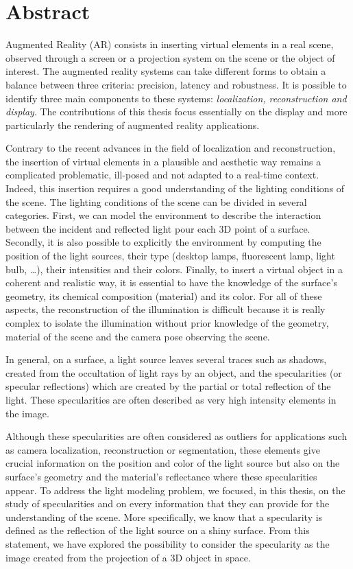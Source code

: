 \chapter*{Abstract}

\vspace{-1.3cm}

Augmented Reality (AR) consists in inserting virtual elements in a real scene, observed through a screen or a projection system on the scene or the object of interest. The augmented reality systems can take different forms to obtain a balance between three criteria: precision, latency and robustness. It is possible to identify three main components to these systems: \textit{localization, reconstruction and display}. The contributions of this thesis focus essentially on the display and more particularly the rendering of augmented reality applications.

Contrary to the recent advances in the field of localization and reconstruction, the insertion of virtual elements in a plausible and aesthetic way remains a complicated problematic, ill-posed and not adapted to a real-time context. Indeed, this insertion requires a good understanding of the lighting conditions of the scene. The lighting conditions of the scene can be divided in several categories. First, we can model the environment to describe the interaction between the incident and reflected light pour each 3D point of a surface. Secondly, it is also possible to explicitly the environment by computing the position of the light sources, their type (desktop lamps, fluorescent lamp, light bulb, \ldots), their intensities and their colors. Finally, to insert a virtual object in a coherent and realistic way, it is essential to have the knowledge of the surface's geometry, its chemical composition (material) and its color. For all of these aspects, the reconstruction of the illumination is difficult because it is really complex to isolate the illumination without prior knowledge of the geometry, material of the scene and the camera pose observing the scene.

In general, on a surface, a light source leaves several traces such as shadows, created from the occultation of light rays by an object, and the specularities (or specular reflections) which are created by the partial or total reflection of the light. These specularities are often described as very high intensity elements in the image.

Although these specularities are often considered as outliers for applications such as camera localization, reconstruction or segmentation, these elements give crucial information on the position and color of the light source but also on the surface's geometry and the material's reflectance where these specularities appear. To address the light modeling problem, we focused, in this thesis, on the study of specularities and on every information that they can provide for the understanding of the scene. More specifically, we know that a specularity is defined as the reflection of the light source on a shiny surface. From this statement, we have explored the possibility to consider the specularity as the image created from the projection of a 3D object in space.


